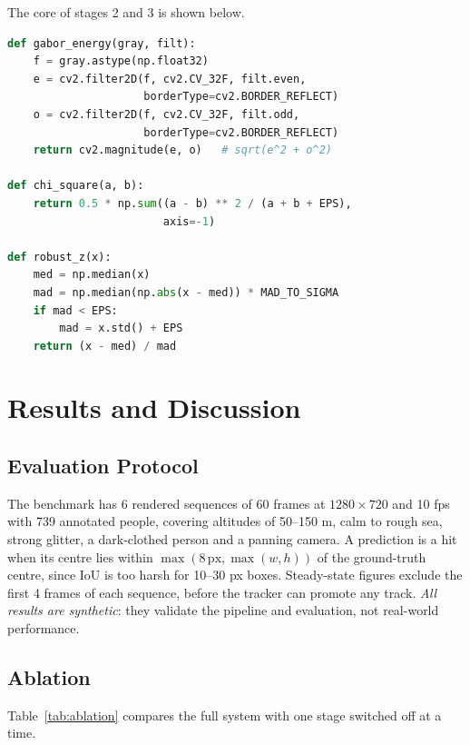 \documentclass[conference,a4paper]{IEEEtran}
\begin{document}
The core of stages 2 and 3 is shown below.
\begin{lstlisting}[language=Python]
def gabor_energy(gray, filt):
    f = gray.astype(np.float32)
    e = cv2.filter2D(f, cv2.CV_32F, filt.even,
                     borderType=cv2.BORDER_REFLECT)
    o = cv2.filter2D(f, cv2.CV_32F, filt.odd,
                     borderType=cv2.BORDER_REFLECT)
    return cv2.magnitude(e, o)   # sqrt(e^2 + o^2)

def chi_square(a, b):
    return 0.5 * np.sum((a - b) ** 2 / (a + b + EPS),
                        axis=-1)

def robust_z(x):
    med = np.median(x)
    mad = np.median(np.abs(x - med)) * MAD_TO_SIGMA
    if mad < EPS:
        mad = x.std() + EPS
    return (x - med) / mad
\end{lstlisting}

\section{Results and Discussion}

\subsection{Evaluation Protocol}

The benchmark has 6 rendered sequences of 60 frames at $1280\times720$ and 10 fps with 739 annotated people, covering altitudes of 50--150 m, calm to rough sea, strong glitter, a dark-clothed person and a panning camera. A prediction is a hit when its centre lies within $\max(8\,\mathrm{px}, \max(w,h))$ of the ground-truth centre, since IoU is too harsh for 10--30 px boxes. Steady-state figures exclude the first 4 frames of each sequence, before the tracker can promote any track. \textit{All results are synthetic}: they validate the pipeline and evaluation, not real-world performance.

\subsection{Ablation}

Table~\ref{tab:ablation} compares the full system with one stage switched off at a time.
\end{document}
